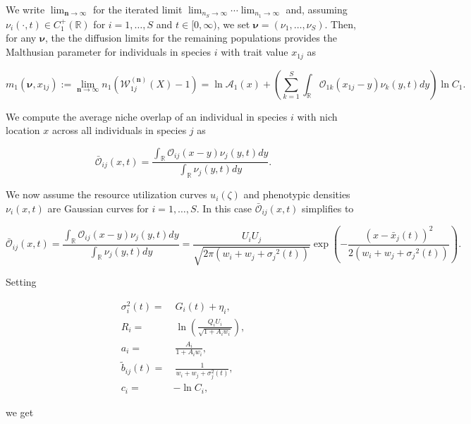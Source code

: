 \documentclass[]{article}
\begin{document}
We write \(\lim_{\pmb n\to\pmb\infty}\) for the iterated limit
\(\lim_{n_S\to\infty}\cdots\lim_{n_1\to\infty}\) and, assuming
\(\nu_i(\cdot,t)\in C_1^+(\mathbb{R})\) for \(i=1,\dots,S\) and
\(t\in[0,\infty)\), we set \(\pmb\nu=(\nu_1,\dots,\nu_S)\). Then, for
any \(\pmb\nu\), the the diffusion limits for the remaining populations
provides the Malthusian parameter for individuals in species \(i\) with
trait value \(x_{1j}\) as

\begin{equation}
m_1(\pmb\nu,x_{1j}):=\lim_{\pmb n\to\pmb\infty}n_1\left(\mathscr W_{1j}^{(\pmb n)}(X)-1\right)=\ln\mathscr{A}_1(x)+\left(\sum_{k=1}^S\int_\mathbb{R}\mathcal{O}_{1k}(x_{1j}-y)\nu_k(y,t)dy\right)\ln C_1.
\end{equation}

We compute the average niche overlap of an individual in species \(i\)
with nich location \(x\) across all individuals in species \(j\) as

\begin{equation}
\bar{\mathcal{O}}_{ij}(x,t)=\frac{\int_\mathbb{R}\mathcal{O}_{ij}(x-y)\nu_j(y,t)dy}{\int_\mathbb{R}\nu_j(y,t)dy}.
\end{equation}

We now assume the resource utilization curves \(u_i(\zeta)\) and
phenotypic densities \(\nu_i(x,t)\) are Gaussian curves for
\(i=1,\dots,S\). In this case \(\bar{\mathcal{O}}_{ij}(x,t)\) simplifies
to

\begin{equation}
\bar{\mathcal{O}}_{ij}(x,t)=\frac{\int_\mathbb{R}\mathcal O_{ij}(x-y)\nu_j(y,t)dy}{\int_\mathbb{R}\nu_j(y,t)dy}
=\frac{U_iU_j}{\sqrt{2\pi(w_i+w_j+{\sigma_j}^2(t))}}\exp\left(-\frac{(x-\bar x_j(t))^2}{2(w_i+w_j+{\sigma_j}^2(t))}\right).
\end{equation}

Setting

\begin{subequations}
\begin{align}
\sigma_i^2(t) = & \ G_i(t)+\eta_i, \\
R_i = & \ \ln \left(\frac{Q_iU_i}{\sqrt{1+A_iw_i}}\right), \\
a_i = & \ \frac{A_i}{1+A_iw_i}, \\
\tilde b_{ij}(t) = & \ \frac{1}{w_i+w_j+\sigma_j^2(t)}, \\
c_i = & -\ln C_i,
\end{align}
\end{subequations}

we get
\end{document}
